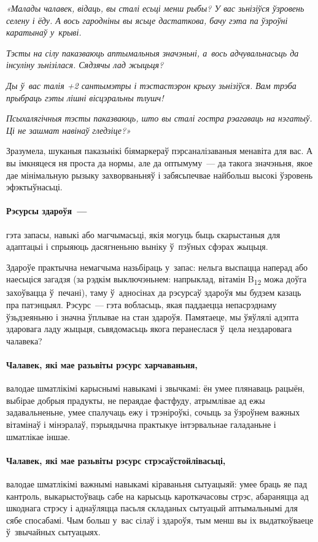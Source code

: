 \emph{«Малады чалавек, відаць, вы сталі есьці менш рыбы? У вас зьнізіўся ўзровень селену і ёду. А вось гародніны вы ясьце дастаткова, бачу гэта па ўзроўні каратынаў у~крыві.}

\emph{Тэсты на сілу паказваюць аптымальныя значэньні, а~вось адчувальнасьць да інсуліну зьнізілася. Сядзячы лад жыцьця?}

\emph{Ды ў~вас талія +2 сантымэтры і тэстастэрон крыху зьнізіўся. Вам трэба прыбраць гэты лішні вісцэральны тлушч!}

\emph{Псыхалягічныя тэсты паказваюць, што вы сталі гостра рэагаваць на нэгатыў. Ці не зашмат навінаў гледзіце?»}

Зразумела, шуканыя паказьнікі біямаркераў пэрсаналізаваныя менавіта для вас. А вы імкняцеся ня проста да нормы, але да оптымуму~--- да такога значэньня, якое дае мінімальную рызыку захворваньняў і забясьпечвае найбольш высокі ўзровень эфэктыўнасьці.

\paragraph{Рэсурсы здароўя~---} гэта запасы, навыкі або магчымасьці, якія могуць быць скарыстаныя для адаптацыі і спрыяюць дасягненьню выніку ў~пэўных сфэрах жыцьця.

Здароўе практычна немагчыма назьбіраць у~запас: нельга выспацца наперад або наесьціся загадзя (за рэдкім выключэньнем: напрыклад, вітамін B\textsubscript{12} можа доўга захоўвацца ў~печані), таму ў~адносінах да рэсурсаў здароўя мы будзем казаць пра патэнцыял. Рэсурс~--- гэта вобласьць, якая паддаецца непасрэднаму ўзьдзеяньню і значна ўплывае на стан здароўя. Памятаеце, мы ўяўлялі адэпта здаровага ладу жыцьця, сьвядомасьць якога перанеслася ў~цела нездаровага чалавека?

\paragraph{Чалавек, які мае разьвіты рэсурс харчаваньня,} валодае шматлікімі карыснымі навыкамі і звычкамі: ён умее плянаваць рацыён, выбірае добрыя прадукты, не пераядае фастфуду, атрымлівае ад ежы задавальненьне, умее спалучаць ежу і трэніроўкі, сочыць за ўзроўнем важных вітамінаў і мінэралаў, пэрыядычна практыкуе інтэрвальнае галаданьне і шматлікае іншае.

\paragraph{Чалавек, які мае разьвіты рэсурс стрэсаўстойлівасьці,} валодае шматлікімі важнымі навыкамі кіраваньня сытуацыяй: умее браць яе пад кантроль, выкарыстоўваць сабе на карысьць кароткачасовы стрэс, абараняцца ад шкоднага стрэсу і аднаўляцца пасьля складаных сытуацый аптымальнымі для сябе спосабамі. Чым больш у~вас сілаў і здароўя, тым менш вы іх выдаткоўваеце ў~звычайных сытуацыях.

